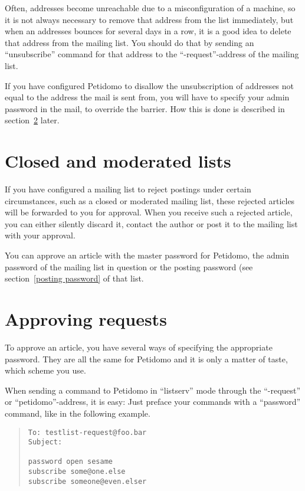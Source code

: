 \documentclass[a4paper,11pt]{scrreprt}
\begin{document}
Often, addresses become unreachable due to a misconfiguration of a
machine, so it is not always necessary to remove that address from the
list immediately, but when an addresses bounces for several days in a
row, it is a good idea to delete that address from the mailing list.
You should do that by sending an ``unsubscribe'' command for that
address to the ``-request''-address of the mailing list.

If you have configured Petidomo to disallow the unsubscription of
addresses not equal to the address the mail is sent from, you will
have to specify your admin password in the mail, to override the
barrier. How this is done is described in section~\ref{approve} later.

\section{Closed and moderated lists}

If you have configured a mailing list to reject postings under certain
circumstances, such as a closed or moderated mailing list, these
rejected articles will be forwarded to you for approval. When you
receive such a rejected article, you can either silently
discard it, contact the author or post it to the mailing list with
your approval.

You can approve an article with the master password for Petidomo, the
admin password of the mailing list in question or the posting password
(see section~\ref{posting password} of that list.

\section{Approving requests}
\label{approve}

To approve an article, you have several ways of specifying the
appropriate password. They are all the same for Petidomo and it is
only a matter of taste, which scheme you use.

When sending a command to Petidomo in ``listserv'' mode through the
``-request'' or ``petidomo''-address, it is easy: Just preface your
commands with a ``password'' command, like in the following example.
\begin{quote}
\begin{verbatim}
To: testlist-request@foo.bar
Subject:

password open sesame
subscribe some@one.else
subscribe someone@even.elser
\end{verbatim}
\end{quote}
\end{document}
